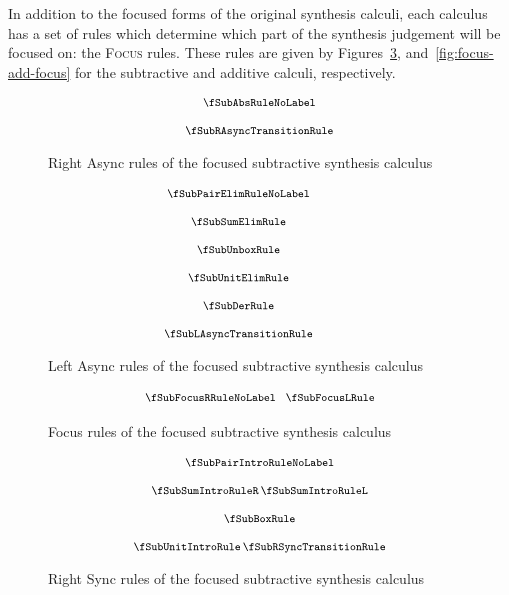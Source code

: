 In addition to the focused forms of the original synthesis calculi, each
calculus has a set of rules which determine which part of the synthesis
judgement will be focused on: the \textsc{Focus} rules. These rules are given by
Figures~\ref{fig:focus-sub-focus}, and~\ref{fig:focus-add-focus} for the
subtractive and additive calculi, respectively.


\begin{figure}[H]
  \begin{align*}
    {\footnotesize{
\begin{array}{c}
  \fSubAbsRuleNoLabel
  \\[1.25em]
  \fSubRAsyncTransitionRule
  \end{array}
    }}
  \end{align*}
  \caption{Right Async rules of the focused subtractive synthesis calculus}
  \label{fig:focus-sub-right-async}
\end{figure}

\begin{figure}[H]
  \begin{align*}
    {\footnotesize{
\hspace{-3.5em}\begin{array}{c}
  \fSubPairElimRuleNoLabel
  \\[1.25em]
  \fSubSumElimRule
  \\[1.25em]
  \fSubUnboxRule
  \\[1.25em]
  \fSubUnitElimRule
  \\[1.25em]
  \fSubDerRule
  \\[1.25em]
  \fSubLAsyncTransitionRule
  \end{array}
    }}
  \end{align*}
  \caption{Left Async rules of the focused subtractive synthesis calculus}
  \label{fig:focus-sub-left-async}
\end{figure}

\begin{figure}[H]
  \begin{align*}
    {\footnotesize{
\begin{array}{c}
  \fSubFocusRRuleNoLabel
  \;\;\;
  \fSubFocusLRule
  \end{array}
    }}
  \end{align*}
  \caption{Focus rules of the focused subtractive synthesis calculus}
  \label{fig:focus-sub-focus}
\end{figure}

\begin{figure}[H]
  \begin{align*}
    {\footnotesize{
\begin{array}{c}
\fSubPairIntroRuleNoLabel
  \\[1.25em]
  \fSubSumIntroRuleR
  \,
  \fSubSumIntroRuleL
  \\[1.25em]
  \fSubBoxRule
  \\[1.25em]
  \fSubUnitIntroRule
  \,
  \fSubRSyncTransitionRule
  \end{array}
    }}
  \end{align*}
  \caption{Right Sync rules of the focused subtractive synthesis calculus}
  \label{fig:focus-sub-right-sync}
\end{figure}

